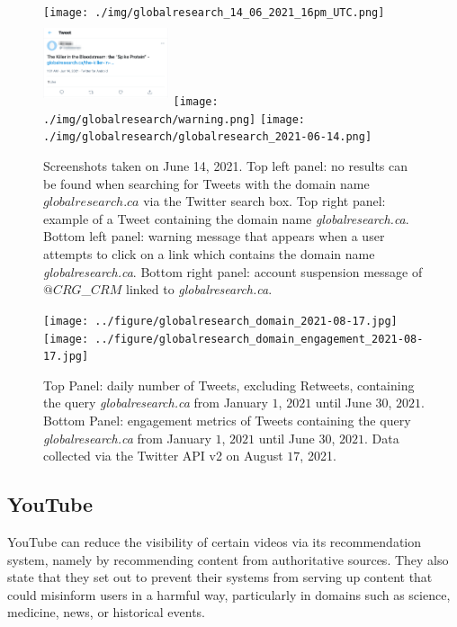\documentclass[Afour,sageh,times]{sagej}
\begin{document}
\begin{figure}[h]
\centering
	\texttt{[image: ./img/globalresearch\_14\_06\_2021\_16pm\_UTC.png]}  
	\includegraphics[width=3.7cm, height=2.5cm]{./img/globalresearch/tweet.png} 
	\texttt{[image: ./img/globalresearch/warning.png]} 	
	\texttt{[image: ./img/globalresearch/globalresearch\_2021-06-14.png]}
	\caption{Screenshots taken on June 14, 2021. Top left panel: no results can be found when searching for Tweets with the domain name $globalresearch.ca$ via the Twitter search box. Top right panel: example of a Tweet containing the domain name {\it globalresearch.ca}. Bottom left panel: warning message that appears when a user attempts to click on a link which contains the domain name {\it globalresearch.ca}. Bottom right panel: account suspension message of $@CRG$\_$CRM$ linked to {\it globalresearch.ca}.}
		\label{fig3}
\end{figure}

\begin{figure}[h]
\centering
\hspace{-2em}
		\texttt{[image: ../figure/globalresearch\_domain\_2021-08-17.jpg]}  		\texttt{[image: ../figure/globalresearch\_domain\_engagement\_2021-08-17.jpg]}
\caption{Top Panel: daily number of Tweets, excluding Retweets, containing the query {\it globalresearch.ca} from January $1$, $2021$ until June $30$, $2021$. Bottom Panel: engagement metrics of Tweets containing the query {\it globalresearch.ca} from January $1$, $2021$ until June $30$, $2021$. Data collected via the Twitter API v2 on August $17$, 2021.   }
\label{fig4}
\end{figure}

\subsection{YouTube}

YouTube can reduce the visibility of certain videos via its recommendation system, namely by recommending content from authoritative sources. They also state that they set out to prevent their systems from serving up content that could misinform users in a harmful way, particularly in domains such as science, medicine, news, or historical events.
\end{document}
